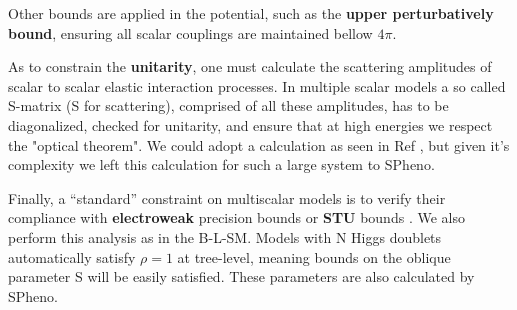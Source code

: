 Other bounds are applied in the potential, such as the \textbf{upper perturbatively bound}, ensuring all scalar couplings are maintained bellow $4\pi$. 


As to constrain the \textbf{unitarity}, one must calculate the scattering amplitudes of scalar to scalar elastic interaction processes. In multiple scalar models a so called S-matrix (S for scattering), comprised of all these amplitudes, has to be diagonalized, checked for unitarity, and ensure that at high energies we respect the "optical theorem". We could adopt a calculation as seen in Ref \cite{Moretti_2015}, but given it's complexity we left this calculation for such a large system to SPheno.

Finally, a “standard” constraint on multiscalar models is to verify their compliance with \textbf{electroweak} precision bounds or \textbf{STU} bounds \cite{Peskin1992}. We also perform this analysis as in the B-L-SM. 
% 
Models with N Higgs doublets automatically satisfy $\rho = 1$ at tree-level, meaning bounds on the oblique parameter S will be easily satisfied. These parameters are also calculated by SPheno. 

